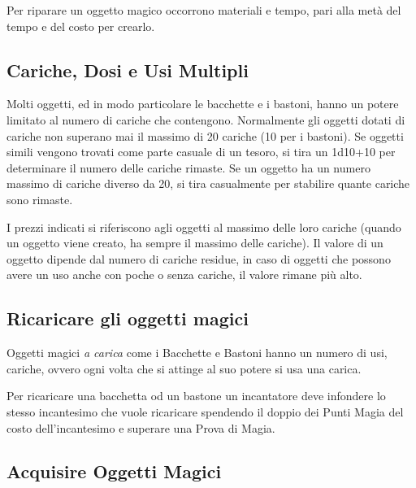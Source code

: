 \begin{multicols}{2}
Per riparare un oggetto magico occorrono materiali e tempo, pari alla metà del tempo e del costo per crearlo.

\subsection{Cariche, Dosi e Usi Multipli}

\label{cariche-dosi-e-usi-multipli}

Molti oggetti, ed in modo particolare le bacchette e i bastoni, hanno un potere limitato al numero di cariche che contengono. Normalmente gli oggetti dotati di cariche non superano mai il massimo di 20 cariche (10 per i bastoni). Se oggetti simili vengono trovati come parte casuale di un tesoro, si tira un 1d10+10 per determinare il numero delle cariche rimaste. Se un oggetto ha un numero massimo di cariche diverso da 20, si tira casualmente per stabilire quante cariche sono rimaste.

I prezzi indicati si riferiscono agli oggetti al massimo delle loro cariche (quando un oggetto viene creato, ha sempre il massimo delle cariche). Il valore di un oggetto dipende dal numero di cariche residue, in caso di oggetti che possono avere un uso anche con poche o senza cariche, il valore rimane più alto.

\subsection{Ricaricare gli oggetti magici}\label{Ricaricare gli oggetti magici}

Oggetti magici \emph{a carica} come i Bacchette e Bastoni hanno un numero di usi, cariche, ovvero ogni volta che si attinge al suo potere si usa una carica.

Per ricaricare una bacchetta od un bastone un incantatore deve infondere lo stesso incantesimo che vuole ricaricare spendendo il doppio dei Punti Magia del costo dell'incantesimo e superare una Prova di Magia.

\end{multicols}

\subsection{Acquisire Oggetti Magici}

\label{acquisire-oggetti-magici}

